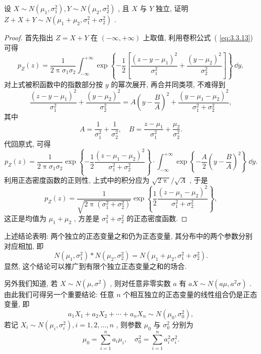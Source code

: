    \begin{example}[(正态分布的可加性)]\label{exam:3.3.6}
   	设 $X\sim N(\mu_1,\sigma_1^2),Y\sim N(\mu_2,\sigma_2^2)$ , 且 $X$ 与 $Y$ 独立, 证明 $Z+X+Y\sim N(\mu_1+\mu_2,\sigma_1^2+\sigma_2^2)$ .
   	\begin{proof}
   		首先指出 $Z=X+Y$ 在 $(-\infty,+\infty)$ 上取值, 利用卷积公式~( \eqref{eq:3.3.13})可得
   		\begin{equation*}
   			p_Z(z)=\frac{1}{2\uppi\sigma_1\sigma_2}\int_{-\infty}^{+\infty}\exp\left\{-\frac{1}{2}\left[\frac{(z-y-\mu_1)^2}{\sigma_1^2}+\frac{(y-\mu_2)^2}{\sigma_2^2}\right]\right\}\,\dd y,
   		\end{equation*}
   		对上式被积函数中的指数部分按 $y$ 的幂次展开, 再合并同类项, 不难得到
   		\begin{equation*}
   			\frac{(z-y-\mu_1)^2}{\sigma_1^2}+\frac{(y-\mu_2)^2}{\sigma_2^2}=A\left(y-\frac{B}{A}\right)^2+\frac{(y-\mu_1-\mu_2)^2}{\sigma_1^2+\sigma_2^2},
   		\end{equation*}
   		其中
   		\begin{equation*}
   			A=\frac{1}{\sigma_1^2}+\frac{1}{\sigma_2^2},\quad B=\frac{z-\mu_1}{\sigma_1^2}+\frac{\mu_2}{\sigma_2^2}.
   		\end{equation*}
   		代回原式, 可得
   		\begin{equation*}
   			p_Z(z)=\frac{1}{2\uppi\sigma_1\sigma_2}\exp\left\{-\frac{1}{2}\frac{(z-\mu_1-\mu_2)^2}{\sigma_1^2+\sigma_2^2}\right\}\cdot\int_{-\infty}^{+\infty}\exp\left\{-\frac{A}{2}\left(y-\frac{B}{A}\right)^2\right\}\,\dd y.
   		\end{equation*}
   		利用正态密度函数的正则性, 上式中的积分应为 $\sqrt{2\uppi}/\sqrt{A}$ , 于是
   		\begin{equation*}
   			p_Z(z)=\frac{1}{\sqrt{2\uppi(\sigma_1^2+\sigma_2^2)}}\exp\left\{\frac{1}{2}\frac{(z-\mu_1-\mu_2)^2}{\sigma_1^2+\sigma_2^2}\right\},
   		\end{equation*}
   		这正是均值为 $\mu_1+\mu_2$ , 方差是 $\sigma_1^2+\sigma_2^2$ 的正态密度函数.
   	\end{proof}
   \end{example}
   上述结论表明: 两个独立的正态变量之和仍为正态变量, 其分布中的两个参数分别对应相加, 即
   \begin{equation}\label{eq:3.3.14}
   	N(\mu_1,\sigma_1^2)\ast N(\mu_2,\sigma_2^2)=N(\mu_1+\mu_2,\sigma_1^2+\sigma_2^2).
   \end{equation}
   显然, 这个结论可以推广到有限个独立正态变量之和的场合.

   另外我们知道, 若 $X\sim N(\mu,\sigma^2)$ , 则对任意非零实数 $a$ 有 $aX\sim N(a\mu,a^2\sigma)$ . 由此我们可得另一个重要结论: 任意 $n$ 个相互独立的正态变量的线性组合仍是正态变量, 即
   \begin{equation}\label{eq:3.3.15}
   	a_1X_1+a_2X_2+\cdots+a_nX_n\sim N(\mu_0,\sigma_0^2),
   \end{equation}
   若记 $X_i\sim N(\mu_i,\sigma_i^2),i=1,2,\ldots,n$ , 则参数 $\mu_0$ 与 $\sigma_0^2$ 分别为
   \begin{equation*}
   	\mu_0=\sum_{i=1}^{n}a_i\mu_i,\quad \sigma_0^2=\sum_{i=1}^{n}a_i^2\sigma_i^2.
   \end{equation*}

